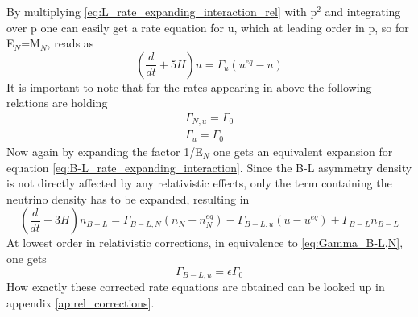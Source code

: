 By multiplying \eqref{eq:L_rate_expanding_interaction_rel} with p$^2$ and integrating over p one can easily get a rate equation for u, which at leading order in p, so for E$_N$=M$_N$, reads as
\begin{equation}
	\left(\frac{d}{dt}+5H\right)u=\Gamma_u\left(u^{eq}-u\right)
	\label{eq:rate_u}
\end{equation}
It is important to note that for the rates appearing in above the following relations are holding
\begin{align}
	\Gamma_{N,u}=\Gamma_{0}
	\label{eq:Gamma_N,u}
	\\
	\Gamma_{u}=\Gamma_{0}
	\label{eq:Gamma_u}
\end{align}
Now again by expanding the factor 1/E$_N$ one gets an equivalent expansion for equation \eqref{eq:B-L_rate_expanding_interaction}. Since the B-L asymmetry density is not directly affected by any relativistic effects, only the term containing the neutrino density has to be expanded, resulting in
\begin{equation}
	\left(\frac{d}{dt}+3H\right)n_{B-L}=\Gamma_{B-L,N}\left(n_N-n_N^{eq}\right)-\Gamma_{B-L,u}\left(u-u^{eq}\right)+\Gamma_{B-L}n_{B-L}
	\label{eq:B-L_rate_expanding_interaction_rel}
\end{equation}
At lowest order in relativistic corrections, in equivalence to \eqref{eq:Gamma_B-L,N}, one gets
\begin{equation}
	\Gamma_{B-L,u}=\epsilon\Gamma_0
	\label{eq:Gamma_B-L,u}
\end{equation}
How exactly these corrected rate equations are obtained can be looked up in appendix \ref{ap:rel_corrections}.
